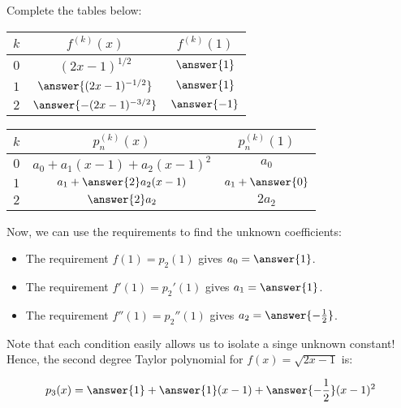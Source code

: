 \documentclass{ximera}
\begin{document}
\begin{exercise}
\begin{exercise}
\begin{exercise}
Complete the tables below:

\begin{tabular}{|c||c|c|}
\hline
$k$ \quad & \quad \quad $f^{(k)}(x)$  \quad \quad & \quad \quad $f^{(k)}(1)$ \quad \quad \\
\hline 
$0$ \quad & \quad \quad $(2x-1)^{1/2}$  \quad \quad & \quad \quad $\answer{1}$ \quad \quad  \\
\hline
$1$ \quad & \quad \quad $\answer{(2x-1)^{-1/2}}$ \quad \quad & \quad \quad $\answer{1}$ \quad \quad \\
\hline
$2$ \quad & \quad \quad $\answer{-(2x-1)^{-3/2}}$ \quad \quad & \quad \quad $\answer{-1}$ \quad \quad \\
\hline 
\end{tabular}

\begin{tabular}{|c||c|c|}
\hline
$k$ \quad & \quad \quad $p_n^{(k)}(x)$  \quad \quad & \quad \quad $p_n^{(k)}(1)$ \quad \quad \\
\hline 
$0$ \quad & \quad \quad $a_0+a_1(x-1)+a_2(x-1)^2$  \quad \quad & \quad \quad $a_0$ \quad \quad  \\
\hline
$1$ \quad & \quad \quad $a_1+\answer{2}a_2(x-1)$ \quad \quad & \quad \quad $a_1+\answer{0}$ \quad \quad \\
\hline
$2$ \quad & \quad \quad $\answer{2}a_2$ \quad \quad & \quad \quad $2a_2$ \quad \quad \\
\hline
\end{tabular}

\begin{exercise}
Now, we can use the requirements to find the unknown coefficients:

\begin{itemize}
\item The requirement $f(1) = p_2(1)$ gives $a_0 = \answer{1}$. 
\item The requirement $f'(1) = p_2'(1)$ gives $a_1 = \answer{1}$. 
\item The requirement $f''(1) = p_2''(1)$ gives $a_2 = \answer{-\frac{1}{2}}$. 
\end{itemize}

Note that each condition easily allows us to isolate a singe unknown constant!  Hence, the second degree Taylor polynomial for $f(x) =\sqrt{2x-1}$ is:

\begin{align*}
p_3(x) &= \answer{1}+\answer{1}(x-1)+\answer{-\frac{1}{2}}(x-1)^2\\
\end{align*}
\end{exercise}
\end{exercise}


\end{exercise}
\end{exercise}
\end{document}
